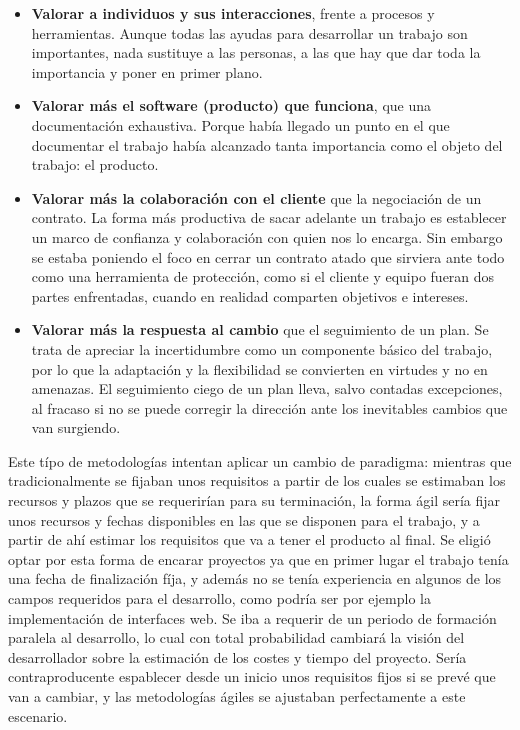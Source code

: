 \begin{itemize}
    \item \textbf{Valorar a individuos y sus interacciones}, frente a procesos y herramientas. Aunque todas las ayudas para desarrollar un trabajo son importantes, nada sustituye a las personas, a las que hay que dar toda la importancia y poner en primer plano.
    \item \textbf{Valorar más el software (producto) que funciona}, que una documentación exhaustiva. Porque había llegado un punto en el que documentar el trabajo había alcanzado tanta importancia como el objeto del trabajo: el producto.
    \item \textbf{Valorar más la colaboración con el cliente} que la negociación de un contrato. La forma más productiva de sacar adelante un trabajo es establecer un marco de confianza y colaboración con quien nos lo encarga. Sin embargo se estaba poniendo el foco en cerrar un contrato atado que sirviera ante todo como una herramienta de protección, como si el cliente y equipo fueran dos partes enfrentadas, cuando en realidad comparten objetivos e intereses.
    \item \textbf{Valorar más la respuesta al cambio} que el seguimiento de un plan. Se trata de apreciar la incertidumbre como un componente básico del trabajo, por lo que la adaptación y la flexibilidad se convierten en virtudes y no en amenazas. El seguimiento ciego de un plan lleva, salvo contadas excepciones, al fracaso si no se puede corregir la dirección ante los inevitables cambios que van surgiendo.
\end{itemize}

Este típo de metodologías intentan aplicar un cambio de paradigma: mientras que tradicionalmente se fijaban unos requisitos a partir de los cuales se estimaban los recursos y plazos que se requerirían para su terminación, la forma ágil sería fijar unos recursos y fechas disponibles en las que se disponen para el trabajo, y a partir de ahí estimar los requisitos que va a tener el producto al final. Se eligió optar por esta forma de encarar proyectos ya que en primer lugar el trabajo tenía una fecha de finalización fíja, y además no se tenía experiencia en algunos de los campos requeridos para el desarrollo, como podría ser por ejemplo la implementación de interfaces web. Se iba a requerir de un periodo de formación paralela al desarrollo, lo cual con total probabilidad cambiará la visión del desarrollador sobre la estimación de los costes y tiempo del proyecto. Sería contraproducente espablecer desde un inicio unos requisitos fijos si se prevé que van a cambiar, y  las metodologías ágiles se ajustaban perfectamente a este escenario.

